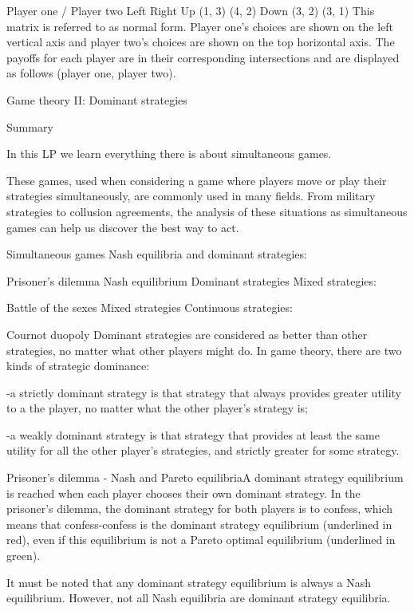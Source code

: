 Player one / Player two	Left	Right
Up	(1, 3)	(4, 2)
Down	(3, 2)	(3, 1)
This matrix is referred to as normal form. Player one's choices are shown on the left vertical axis and player two's choices are shown on the top horizontal axis. The payoffs for each player are in their corresponding intersections and are displayed as follows (player one, player two).



Game theory II: Dominant strategies

Summary

In this LP we learn everything there is about simultaneous games. 

These games, used when considering a game where players move or play their strategies simultaneously, are commonly used in many fields. From military strategies to collusion agreements, the analysis of these situations as simultaneous games can help us discover the best way to act.

Simultaneous games
Nash equilibria and dominant strategies:

Prisoner’s dilemma
Nash equilibrium
Dominant strategies
Mixed strategies:

Battle of the sexes
Mixed strategies
Continuous strategies:

Cournot duopoly
Dominant strategies are considered as better than other strategies, no matter what other players might do. In game theory, there are two kinds of strategic dominance:

-a strictly dominant strategy is that strategy that always provides greater utility to a the player, no matter what the other player’s strategy is;

-a weakly dominant strategy is that strategy that provides at least the same utility for all the other player’s strategies, and strictly greater for some strategy.

 

Prisoner's dilemma - Nash and Pareto equilibriaA dominant strategy equilibrium is reached when each player chooses their own dominant strategy. In the prisoner’s dilemma, the dominant strategy for both players is to confess, which means that confess-confess is the dominant strategy equilibrium (underlined in red), even if this equilibrium is not a Pareto optimal equilibrium (underlined in green).

It must be noted that any dominant strategy equilibrium is always a Nash equilibrium. However, not all Nash equilibria are dominant strategy equilibria.

